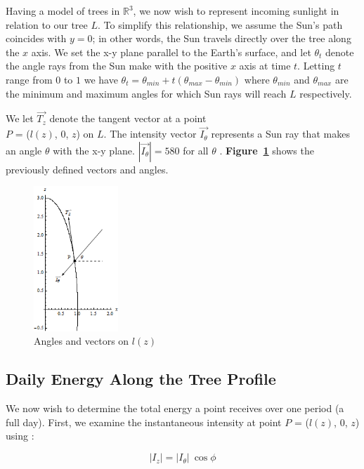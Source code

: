 \documentclass[10pt]{article}
\numberwithin{equation}{subsection}
\begin{document}
Having a model of trees in $\mathbb{R}^3$, we now wish to represent
incoming sunlight in relation to our tree $L$. To simplify this
relationship, we assume the Sun's path coincides with $y=0$; in other
words, the Sun travels directly over the tree along the $x$ axis. We
set the x-y plane parallel to the Earth's surface, and let $\theta_t$
denote the angle rays from the Sun make with the positive $x$ axis at
time $t$. Letting $t$ range from $0$ to $1$ we have $\theta_t =
\theta_{min} + t(\theta_{max} - \theta_{min})$ where $\theta_{min}$
and $\theta_{max}$ are the minimum and maximum angles for which Sun
rays will reach $L$ respectively.

We let $\vec{T_z}$ denote the tangent vector at a point \\ $P$ =
($l(z)$, 0, $z$) on $L$. The intensity vector $\vec{I_\theta}$
represents a Sun ray that makes an angle $\theta$ with the x-y
plane. $|\vec{I_\theta}| = 580$ for all $\theta$
\citep{sunLight02}. {\bf Figure~\ref{fig:vectors}} shows the
previously defined vectors and angles.


\begin{figure}[h!]
  \centering
  \includegraphics[width=120px]{img/vectors.png}
  \caption{Angles and vectors on $l(z)$}
  \label{fig:vectors}
\end{figure}


\subsection{Daily Energy Along the Tree Profile}
We now wish to determine the total energy a point receives over one
period (a full day). First, we examine the instantaneous intensity at
point $P$ = ($l(z)$, 0, $z$) using \citep{website:sunLight01}:
\begin{center}
  \begin{equation}\label{eqn:intbasic}
    |I_z| = |I_\theta| \  \cos\phi
  \end{equation}
\end{center}
\end{document}
